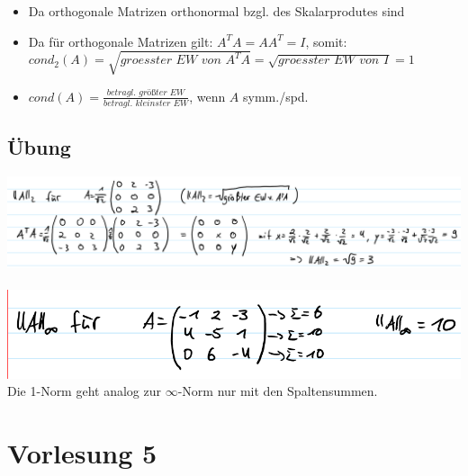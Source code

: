 \documentclass[]{article}
\begin{document}
\begin{enumerate}
			\begin{itemize}
				\item Da orthogonale Matrizen orthonormal bzgl. des Skalarprodutes sind
				\item Da für orthogonale Matrizen gilt: $A^TA = AA^T = I$, somit: \newline $cond_2(A) = \sqrt{\textit{groesster EW von } A^TA} = \sqrt{\textit{groesster EW von } I} = 1$
				\item $cond(A) = \frac{\textit{betragl. größter EW}}{\textit{betragl. kleinster EW}}$, wenn $A$ symm./spd.
			\end{itemize}
	\end{enumerate}
\subsection{Übung}
	\includegraphics[width=\textwidth]{res/vl4-1.png}
	\\ \\
	\includegraphics[width=\textwidth]{res/vl4-2.png}
	\\
	Die 1-Norm geht analog zur $\infty$-Norm nur mit den Spaltensummen.

\section{Vorlesung 5}
\end{document}
